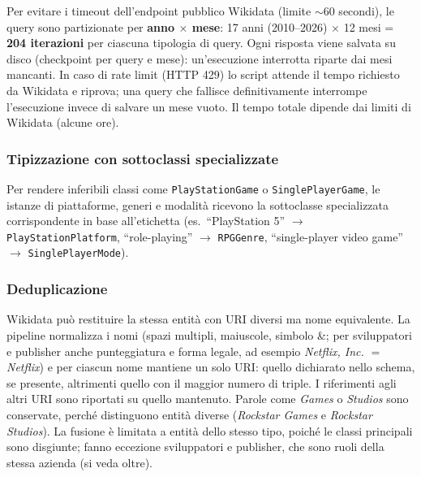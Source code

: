 Per evitare i timeout dell'endpoint pubblico Wikidata (limite $\sim$60 secondi),
le query sono partizionate per \textbf{anno $\times$ mese}: 17 anni (2010--2026)
$\times$ 12 mesi = \textbf{204 iterazioni} per ciascuna tipologia di query. Ogni risposta
viene salvata su disco (checkpoint per query e mese): un'esecuzione interrotta riparte dai mesi
mancanti. In caso di rate limit (HTTP 429) lo script attende il tempo richiesto da Wikidata e riprova;
una query che fallisce definitivamente interrompe l'esecuzione invece di salvare un mese vuoto.
Il tempo totale dipende dai limiti di Wikidata (alcune ore).

\subsubsection{Tipizzazione con sottoclassi specializzate}

Per rendere inferibili classi come \texttt{PlayStationGame} o \texttt{SinglePlayerGame}, le
istanze di piattaforme, generi e modalit\`a ricevono la sottoclasse specializzata corrispondente in base
all'etichetta (es.\ ``PlayStation 5'' $\rightarrow$ \texttt{PlayStationPlatform}, ``role-playing''
$\rightarrow$ \texttt{RPGGenre}, ``single-player video game'' $\rightarrow$ \texttt{SinglePlayerMode}).

\subsubsection{Deduplicazione}

Wikidata pu\`o restituire la stessa entit\`a con URI diversi ma nome equivalente. La pipeline normalizza
i nomi (spazi multipli, maiuscole, simbolo \&; per sviluppatori e publisher anche punteggiatura e forma
legale, ad esempio \emph{Netflix, Inc.} $=$ \emph{Netflix}) e per ciascun nome mantiene un solo URI: quello
dichiarato nello schema, se presente, altrimenti quello con il maggior numero di triple. I riferimenti agli
altri URI sono riportati su quello mantenuto. Parole come \emph{Games} o \emph{Studios} sono conservate,
perch\'e distinguono entit\`a diverse (\emph{Rockstar Games} e \emph{Rockstar Studios}). La fusione \`e
limitata a entit\`a dello stesso tipo, poich\'e le classi principali sono disgiunte; fanno eccezione
sviluppatori e publisher, che sono ruoli della stessa azienda (si veda oltre).

